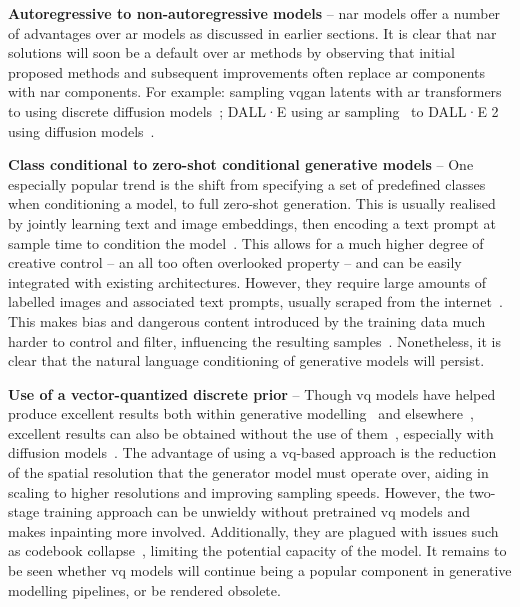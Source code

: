 \textbf{Autoregressive to non-autoregressive models} -- 
\Gls{nar} models offer a number of advantages over \gls{ar} models as discussed
in earlier sections. It is clear that \gls{nar} solutions will soon be a default
over \gls{ar} methods by observing that initial proposed methods and
subsequent improvements often replace \gls{ar} components with \gls{nar}
components. For example: sampling \gls{vqgan} latents with \gls{ar}
transformers~\cite{esser2021taming} to using discrete diffusion
models~\cite{bondtaylor2021unleashing}; DALL·E using \gls{ar}
sampling~\cite{ramesh2021dalle} to DALL·E 2 using diffusion
models~\cite{ramesh2022dalle2}.

\textbf{Class conditional to zero-shot conditional generative models} -- One
especially popular trend is the shift from specifying a set of predefined
classes when conditioning a model, to full zero-shot generation. This is usually
realised by jointly learning text and image embeddings, then encoding a text
prompt at sample time to condition the
model~\cite{ramesh2021dalle,ramesh2022dalle2,rombach2021highresolution,lee2022rqvae}.
This allows for a much higher degree of creative control -- an all too often
overlooked property -- and can be easily integrated with existing architectures.
However, they require large amounts of labelled images and associated text
prompts, usually scraped from the
internet~\cite{rombach2021highresolution,ramesh2021dalle,ramesh2022dalle2}. This
makes bias and dangerous content introduced by the training data much harder to
control and filter, influencing the resulting samples~\cite{mishkin2022risks}.
Nonetheless, it is clear that the natural language conditioning of generative
models will persist.

\textbf{Use of a vector-quantized discrete prior} -- 
Though \gls{vq} models have helped produce excellent results both within
generative
modelling~\cite{razavi2019generating,esser2021taming,bondtaylor2021unleashing,rombach2021highresolution,ramesh2021dalle,yu2021vqgan,lee2022rqvae}
and elsewhere~\cite{zeghidour2021soundstream}, excellent results can also be
obtained without the use of
them~\cite{child2020vqvae,arash2020nvae,hazami2022efficient}, especially with
diffusion
models~\cite{song2019sbm,song2020sde,dhariwal2021ddpm,song2021mlt,xiao2021trilemma,vahdat2021sbmlatent,martineau2021fast,dockhorn2021langevin}.
The advantage of using a \gls{vq}-based approach is the
reduction of the spatial resolution that the generator model must operate
over, aiding in scaling to higher resolutions and improving sampling speeds.
However, the two-stage training approach can be unwieldy without pretrained
\gls{vq} models and makes inpainting more involved. Additionally,
they are plagued with issues such as codebook
collapse~\cite{esser2021taming,bondtaylor2021unleashing,yu2021vqgan}, limiting
the potential capacity of the model. It remains to be seen whether \gls{vq}
models will continue being a popular component in generative modelling pipelines,
or be rendered obsolete.

